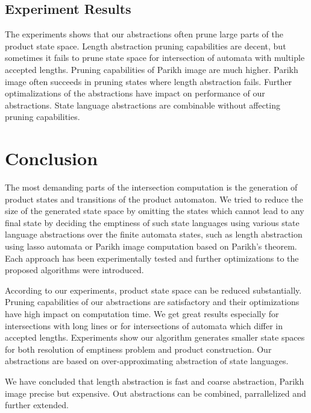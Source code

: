 \section{Experiment Results}

The experiments shows that our abstractions often prune large parts of the product state space. Length abstraction pruning capabilities are decent, but sometimes it fails to prune state space for intersection of automata with multiple accepted lengths. Pruning capabilities of Parikh image are much higher. Parikh image often succeeds in pruning states where length abstraction fails. Further optimalizations of the abstractions have impact on performance of our abstractions. State language abstractions are combinable without affecting pruning capabilities.

\chapter{Conclusion}

The most demanding parts of the intersection computation is the generation of product states and transitions of the product automaton. We tried to reduce the size of the generated state space by omitting the states which cannot lead to any final state by deciding the emptiness of such state languages using various state language abstractions over the finite automata states, such as length abstraction using lasso automata or Parikh image computation based on Parikh's theorem. Each approach has been experimentally tested and further optimizations to the proposed algorithms were introduced.

According to our experiments, product state space can be reduced substantially. Pruning capabilities of our abstractions are satisfactory and their optimizations have high impact on computation time. We get great results especially for intersections with long lines or for intersections of automata which differ in accepted lengths. Experiments show our algorithm generates smaller state spaces for both resolution of emptiness problem and product construction. Our abstractions are based on over-approximating abstraction of state languages.

We have concluded that length abstraction is fast and coarse abstraction, Parikh image precise but expensive. Out abstractions can be combined, parrallelized and further extended.

